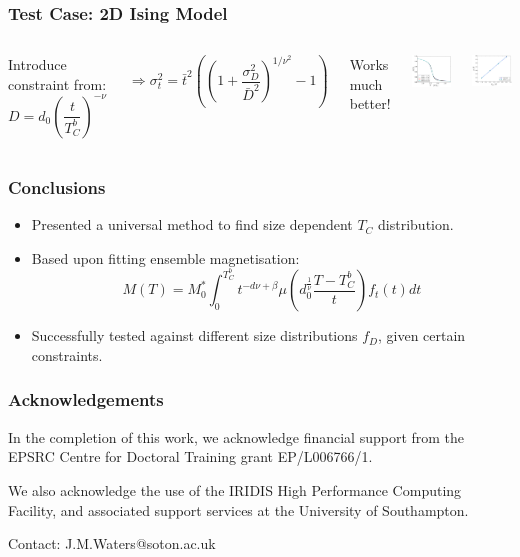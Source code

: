 \documentclass{beamer}
\begin{document}
\begin{frame}
	\frametitle{Test Case: 2D Ising Model}
	\begin{columns}
	\column{7cm}
		Introduce constraint from:
		$$
		D = d_0\left(\frac{t}{T_C^b}\right)^{-\nu}
		$$
		
		$$\Rightarrow \sigma_t^2 = \bar{t}^2\left(\left(1 + \frac{\sigma_D^2}{\bar{D}^2}\right)^{1/\nu^2}-1\right)
		$$
		
		\begin{center}
		Works much better!
		\end{center}
	\column{5cm}
		\includegraphics[width=4.5cm]{Images/distros}
		
		\includegraphics[width=4.5cm]{Images/constr}
	\end{columns}
\end{frame}

\begin{frame}
	\frametitle{Conclusions}
	\begin{itemize}
		\item{Presented a universal method to find size dependent $T_C$ distribution.}
		\item{Based upon fitting ensemble magnetisation:}
		$$
		M(T) = M_0^*\int_0^{T_C^b} t^{-d\nu +\beta} \mu\left(d_0^{\frac{1}{\nu}}\frac{T-T_C^b}{t}\right) f_t(t) dt
		$$
		\item{Successfully tested against different size distributions $f_D$, given certain constraints.}
	\end{itemize}
\end{frame}

\begin{frame}
	\frametitle{Acknowledgements}
	In the completion of this work, we acknowledge financial support from the EPSRC Centre for Doctoral Training grant EP/L006766/1. \newline
	
	We also acknowledge the use of the IRIDIS High Performance Computing Facility, and associated support services at the University of
Southampton. \newline

	Contact: J.M.Waters@soton.ac.uk
\end{frame}
\end{document}
